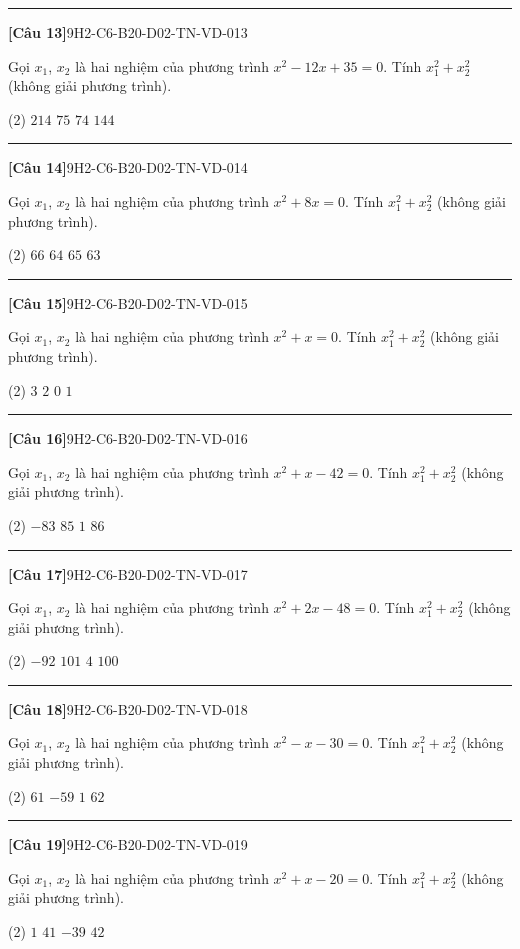 \documentclass[12pt,a4paper]{article}
\newif\ifloigiai
\newenvironment{cauhoi}[2]{%
  \par\medskip\noindent\rule{\textwidth}{0.4pt}\par\nopagebreak
  \noindent\textbf{[#1]}\hfill{\scriptsize\ttfamily #2}\par\nopagebreak\smallskip}{\par}
\newcommand{\dapan}[1]{\ifloigiai\par\smallskip\noindent\textit{Đáp án:} \textbf{#1}\par\fi}
\begin{document}
\begin{cauhoi}{Câu 13}{9H2-C6-B20-D02-TN-VD-013}
Gọi $x_1$, $x_2$ là hai nghiệm của phương trình $x^{2}-12x+35=0$. Tính $x_1^{2}+x_2^{2}$ (không giải phương trình).
\begin{tasks}(2)
\task $214$
\task $75$
\task $74$
\task $144$
\end{tasks}
\dapan{C}
\end{cauhoi}
\begin{cauhoi}{Câu 14}{9H2-C6-B20-D02-TN-VD-014}
Gọi $x_1$, $x_2$ là hai nghiệm của phương trình $x^{2}+8x=0$. Tính $x_1^{2}+x_2^{2}$ (không giải phương trình).
\begin{tasks}(2)
\task $66$
\task $64$
\task $65$
\task $63$
\end{tasks}
\dapan{B}
\end{cauhoi}
\begin{cauhoi}{Câu 15}{9H2-C6-B20-D02-TN-VD-015}
Gọi $x_1$, $x_2$ là hai nghiệm của phương trình $x^{2}+x=0$. Tính $x_1^{2}+x_2^{2}$ (không giải phương trình).
\begin{tasks}(2)
\task $3$
\task $2$
\task $0$
\task $1$
\end{tasks}
\dapan{D}
\end{cauhoi}
\begin{cauhoi}{Câu 16}{9H2-C6-B20-D02-TN-VD-016}
Gọi $x_1$, $x_2$ là hai nghiệm của phương trình $x^{2}+x-42=0$. Tính $x_1^{2}+x_2^{2}$ (không giải phương trình).
\begin{tasks}(2)
\task $-83$
\task $85$
\task $1$
\task $86$
\end{tasks}
\dapan{B}
\end{cauhoi}
\begin{cauhoi}{Câu 17}{9H2-C6-B20-D02-TN-VD-017}
Gọi $x_1$, $x_2$ là hai nghiệm của phương trình $x^{2}+2x-48=0$. Tính $x_1^{2}+x_2^{2}$ (không giải phương trình).
\begin{tasks}(2)
\task $-92$
\task $101$
\task $4$
\task $100$
\end{tasks}
\dapan{D}
\end{cauhoi}
\begin{cauhoi}{Câu 18}{9H2-C6-B20-D02-TN-VD-018}
Gọi $x_1$, $x_2$ là hai nghiệm của phương trình $x^{2}-x-30=0$. Tính $x_1^{2}+x_2^{2}$ (không giải phương trình).
\begin{tasks}(2)
\task $61$
\task $-59$
\task $1$
\task $62$
\end{tasks}
\dapan{A}
\end{cauhoi}
\begin{cauhoi}{Câu 19}{9H2-C6-B20-D02-TN-VD-019}
Gọi $x_1$, $x_2$ là hai nghiệm của phương trình $x^{2}+x-20=0$. Tính $x_1^{2}+x_2^{2}$ (không giải phương trình).
\begin{tasks}(2)
\task $1$
\task $41$
\task $-39$
\task $42$
\end{tasks}
\dapan{B}
\end{cauhoi}
\end{document}

